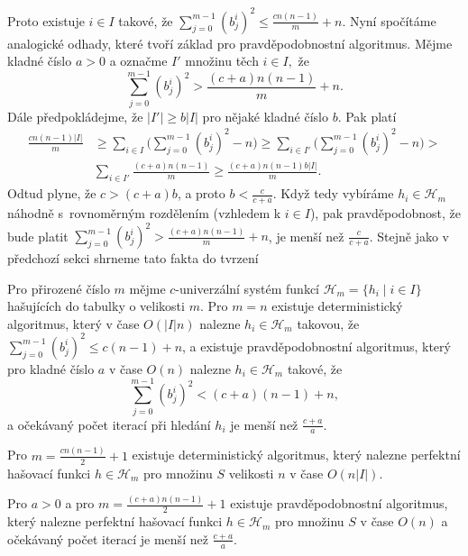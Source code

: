 \documentclass[a4paper,12pt]{article}
\begin{document}
Proto existuje $i\in I$ takové, že $\sum_{j=0}^{m-
1}(b^i_j)^2\le\frac {cn(n-1)}m+n$. Nyní 
spočítáme analogické odhady, které tvoří základ pro 
pravděpodobnostní algoritmus. Mějme kladné číslo $
a>0$ a 
označme $I'$ množinu těch $i\in I,$ že  
$$\sum_{j=0}^{m-1}(b^i_j)^2>\frac {(c+a)n(n-1)}m+n.$$
Dále předpokládejme, že $|I'|\ge b|I|$ pro 
nějaké kladné číslo $b$. Pak platí 
\begin{align*}\frac {cn(n-1)|I|}m&\ge\sum_{i\in I}\big(\sum_{j=0}^{m-1}
(b^i_j)^2-n\big)\ge\sum_{i\in I'}\big(\sum_{j=0}^{m-1}(b^i_j)^2-n\big
)>\\
&\sum_{i\in I'}\frac {(c+a)n(n-1)}m\ge\frac {(c+a)n(n-1)b|I|}m.\end{align*}
Odtud plyne, že $c>(c+a)b$, a proto $b<\frac c{c+a}$. Když tedy vybíráme  
$h_i\in \mathcal H_m$ náhodně s~rovnoměrným rozdělením (vzhledem k $
i\in I$), pak 
pravděpo\-dobnost, že bude platit $\sum_{j=0}^{m-1}(b^i_j)^
2>\frac {(c+a)n(n-1)}m+n$, je 
menší než $\frac c{c+a}$. Stejně jako v předchozí sekci shrneme tato fakta do tvrzení 

\begin{tvrzeni}Pro přirozené číslo $m$ mějme $
c$-univerzální systém funkcí $\mathcal H_m=\{h_i\mid i\in 
I\}$ hašujících do tabulky o velikosti 
$m$. Pro $m=n$ existuje deterministický algoritmus, 
který v čase $O(|I|n)$ nalezne $h_i\in \mathcal H_m$ takovou, že $
\sum_{j=0}^{m-1}(b^i_j)^2\le c(n-1)+n$, 
a existuje pravděpodobnostní algoritmus, který pro kladné číslo 
$a$ v čase $O(n)$ nalezne $h_i\in \mathcal H_m$ takové, že 
$$\sum_{j=0}^{m-1}(b^i_j)^2<(c+a)(n-1)+n,$$
a očekávaný počet iterací při hledání $h_i$ je menší než $\frac {
c+a}a$.   

Pro $m=\frac {cn(n-1)}2+1$ existuje deterministický algoritmus, 
který nalezne perfektní hašovací funkci  $h\in \mathcal H_
m$ pro množinu $S$ 
velikosti $n$ v čase $O(n|I|)$.

Pro $a>0$ a pro $m=\frac {(c+a)n(n-1)}2+1$ existuje 
pravděpodobnostní algoritmus, který nalezne perfektní hašovací 
funkci $h\in \mathcal H_m$ pro množinu $S$ v čase $O(n)$ a očekávaný počet 
iterací je menší než $\frac {c+a}a$.  
\end{tvrzeni}
\end{document}
